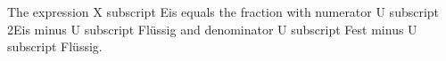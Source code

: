 The expression X subscript Eis equals the fraction with numerator U subscript 2Eis minus U subscript Flüssig and denominator U subscript Fest minus U subscript Flüssig.